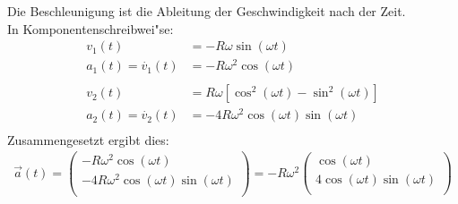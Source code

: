 \documentclass{theozettel}
\begin{document}
	Die Beschleunigung ist die Ableitung der Geschwindigkeit nach der Zeit.\\
	In Komponentenschreibwei"se:
	\begin{align*}
	v_1\left(t\right) &=  - R \omega \sin\left(\omega t\right)\\
	 a_1\left(t\right) =\dot{v_1}\left(t\right) &= - R \omega^2 \cos\left(\omega t\right)\\\\	 
	 v_2\left(t\right) &= R \omega \left[\cos^2\left(\omega t\right) - \sin^2\left(\omega t\right)\right]\\
	 a_2\left(t\right) =\dot{v_2}\left(t\right) &= -4 R \omega^2  \cos\left(\omega t\right) \sin\left(\omega t\right)\\
	\end{align*}
	Zusammengesetzt ergibt dies:
	\begin{align*}	
	\vec{a}\left(t\right) =
	\begin{pmatrix}
	- R \omega^2 \cos\left(\omega t\right)\\
	-4 R \omega^2  \cos\left(\omega t\right) \sin\left(\omega t\right)\\
	\end{pmatrix}
	= -R\omega^2
	\begin{pmatrix}
	 \cos\left(\omega t\right)\\
	4 \cos\left(\omega t\right) \sin\left(\omega t\right)\\
	\end{pmatrix}
	\end{align*}
\end{document}
